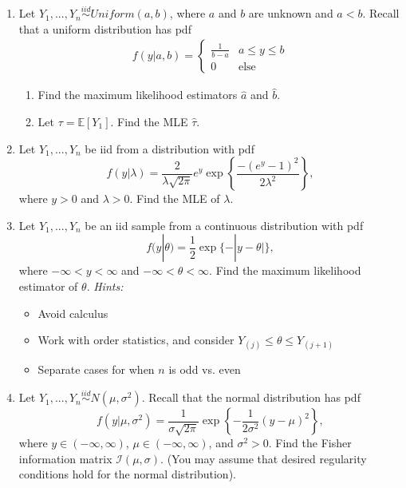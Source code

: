 \documentclass[11pt]{article}
\begin{document}
\begin{enumerate}
\item Let $Y_1,...,Y_n \overset{iid}{\sim} Uniform(a, b)$, where $a$ and $b$ are unknown and $a < b$. Recall that a uniform distribution has pdf
\begin{align*}
f(y|a,b) = \begin{cases}
\frac{1}{b - a} & a \leq y \leq b \\
0 & \text{else}
\end{cases}
\end{align*}
\begin{enumerate}
\item Find the maximum likelihood estimators $\widehat{a}$ and $\widehat{b}$.
\item Let $\tau = \mathbb{E}[Y_1]$. Find the MLE $\widehat{\tau}$.
\end{enumerate}

\item Let $Y_1,...,Y_n$ be iid from a distribution with pdf
$$f(y|\lambda) = \frac{2}{\lambda \sqrt{2 \pi}} e^y \exp \left\lbrace \frac{-(e^y - 1)^2}{2\lambda^2} \right\rbrace,$$
where $y > 0$ and $\lambda > 0$. Find the MLE of $\lambda$.

\item Let $Y_1,...,Y_n$ be an iid sample from a continuous distribution with pdf 
$$f(y|\theta) = \frac{1}{2} \exp\{-|y - \theta|\},$$
where $-\infty < y < \infty$ and $-\infty < \theta < \infty$. Find the maximum likelihood estimator of $\theta$. \textit{Hints:}
\begin{itemize}
\item Avoid calculus
\item Work with order statistics, and consider $Y_{(j)} \leq \theta \leq Y_{(j+1)}$
\item Separate cases for when $n$ is odd vs. even
\end{itemize}

\item Let $Y_1,...,Y_n \overset{iid}{\sim} N(\mu, \sigma^2)$. Recall that the normal distribution has pdf
$$f(y|\mu, \sigma^2) = \dfrac{1}{\sigma \sqrt{2 \pi}} \exp \left\lbrace -\frac{1}{2\sigma^2}(y - \mu)^2 \right\rbrace,$$
where $y \in (-\infty, \infty)$, $\mu \in (-\infty, \infty)$, and $\sigma^2 > 0$. Find the Fisher information matrix $\mathcal{I}(\mu, \sigma)$. (You may assume that desired regularity conditions hold for the normal distribution).

\end{enumerate}
\end{document}
